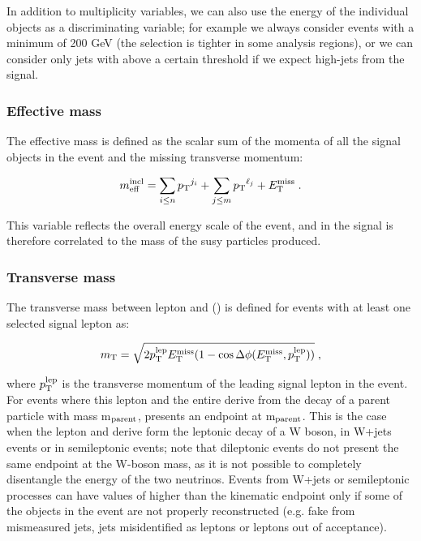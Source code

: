 \noindent In addition to multiplicity variables, we can also use the energy of the individual objects as a discriminating variable; 
for example we always consider events with a minimum \met of 200 GeV (the selection is tighter in some analysis regions), 
or we can consider only jets with \pt above a certain threshold if we expect high-\pt jets from the signal. 

\subsubsection*{Effective mass}

The effective mass is defined as the scalar sum of the momenta of all the signal objects in the event and the missing transverse momentum:

\begin{equation}
m_{\mathrm{eff}}^{\mathrm{incl}} = \sum_{i\leq n} {p_{\rm T}}^{j_i}  + \sum_{j\leq m} {p_{\rm T}}^{\ell_j}  + E_{\rm T}^{\mathrm{miss}} \; .
\end{equation}

\noindent This variable reflects the overall energy scale of the event, and in the signal is therefore correlated to the mass of the \gls{susy} particles produced. 

\subsubsection*{Transverse mass}

The transverse mass between lepton and \met (\mt) is defined for events with at least one selected signal lepton as: 

\begin{equation}
m_\mathrm{T} = \sqrt{2p_{\rm T}^{\rm{lep}}E_{\rm T}^{\mathrm{miss}}(1-\cos\Delta\phi(E_{\rm T}^{\mathrm{miss}},p_{\rm T}^{\rm{lep}}))} \; ,
\end{equation}

\noindent where $p_{\rm T}^{\rm{lep}}$ is the transverse momentum of the leading signal lepton in the event. 
For events where this lepton and the entire \met derive from the decay of a parent particle with mass m$_{\rm{parent}}$, \mt presents an endpoint at m$_{\rm{parent}}$. 
This is the case when the lepton and \met derive form the leptonic decay of a W boson, in W+jets events or in semileptonic \ttbar events; 
note that dileptonic \ttbar events do not present the same endpoint at the W-boson mass, as it is not possible to completely disentangle the energy of the two neutrinos. Events from W+jets or semileptonic \ttbar processes can have values of \mt higher than the kinematic endpoint only if some of the objects in the event are not properly reconstructed (e.g. fake \met from mismeasured jets, jets misidentified as leptons or leptons out of acceptance).

